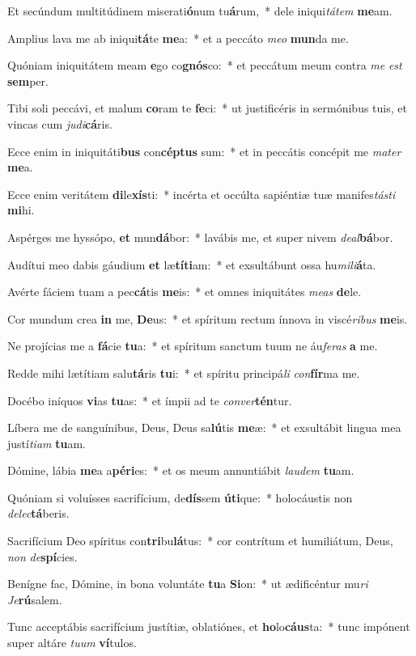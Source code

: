 \item Et secúndum multitúdinem miserati\textbf{ó}num tu\textbf{á}rum,~* dele iniqui\textit{tá}\textit{tem} \textbf{me}am.
\item Amplius lava me ab iniqui\textbf{tá}te \textbf{me}a:~* et a peccáto \textit{me}\textit{o} \textbf{mun}da me.
\item Quóniam iniquitátem meam \textbf{e}go co\textbf{gnós}co:~* et peccátum meum contra \textit{me} \textit{est} \textbf{sem}per.
\item Tibi soli peccávi, et malum \textbf{co}ram te \textbf{fe}ci:~* ut justificéris in sermónibus tuis, et vincas cum \textit{ju}\textit{di}\textbf{cá}ris.
\item Ecce enim in iniquitáti\textbf{bus} con\textbf{cép}\textbf{tus} sum:~* et in peccátis concépit me \textit{ma}\textit{ter} \textbf{me}a.
\item Ecce enim veritátem \textbf{di}le\textbf{xís}ti:~* incérta et occúlta sapiéntiæ tuæ manifes\textit{tás}\textit{ti} \textbf{mi}hi.
\item Aspérges me hyssópo, \textbf{et} mun\textbf{dá}bor:~* lavábis me, et super nivem \textit{de}\textit{al}\textbf{bá}bor.
\item Audítui meo dabis gáudium \textbf{et} læ\textbf{tí}\textbf{ti}am:~* et exsultábunt ossa hu\textit{mi}\textit{li}\textbf{á}ta.
\item Avérte fáciem tuam a pec\textbf{cá}tis \textbf{me}is:~* et omnes iniquitátes \textit{me}\textit{as} \textbf{de}le.
\item Cor mundum crea \textbf{in} me, \textbf{De}us:~* et spíritum rectum ínnova in viscé\textit{ri}\textit{bus} \textbf{me}is.
\item Ne projícias me a \textbf{fá}cie \textbf{tu}a:~* et spíritum sanctum tuum ne áu\textit{fe}\textit{ras} \textbf{a} me.
\item Redde mihi lætítiam salu\textbf{tá}ris \textbf{tu}i:~* et spíritu principá\textit{li} \textit{con}\textbf{fír}ma me.
\item Docébo iníquos \textbf{vi}as \textbf{tu}as:~* et ímpii ad te \textit{con}\textit{ver}\textbf{tén}tur.
\item Líbera me de sanguínibus, Deus, Deus sa\textbf{lú}tis \textbf{me}æ:~* et exsultábit lingua mea justí\textit{ti}\textit{am} \textbf{tu}am.
\item Dómine, lábia \textbf{me}a a\textbf{pé}\textbf{ri}es:~* et os meum annuntiábit \textit{lau}\textit{dem} \textbf{tu}am.
\item Quóniam si voluísses sacrifícium, de\textbf{dís}sem \textbf{ú}\textbf{ti}que:~* holocáustis non \textit{de}\textit{lec}\textbf{tá}beris.
\item Sacrifícium Deo spíritus con\textbf{tri}bu\textbf{lá}tus:~* cor contrítum et humiliátum, Deus, \textit{non} \textit{de}\textbf{spí}cies.
\item Benígne fac, Dómine, in bona voluntáte \textbf{tu}a \textbf{Si}on:~* ut ædificéntur mu\textit{ri} \textit{Je}\textbf{rú}salem.
\item Tunc acceptábis sacrifícium justítiæ, oblatiónes, et \textbf{ho}lo\textbf{cáus}ta:~* tunc impónent super altáre \textit{tu}\textit{um} \textbf{ví}tulos.
